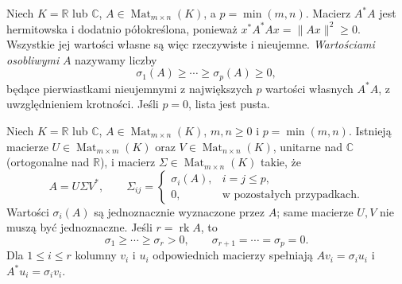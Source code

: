 \begin{definicja}
\label{def:lin15-singular-values}
Niech \(K=\mathbb R\) lub \(\mathbb C\),
\(A\in\operatorname{Mat}_{m\times n}(K)\),
a \(p=\min(m,n)\).
Macierz \(A^*A\) jest hermitowska
i dodatnio półokreślona, ponieważ
\(x^*A^*Ax=\|Ax\|^2\ge0\).
Wszystkie jej wartości własne
są więc rzeczywiste i nieujemne.
\emph{Wartościami osobliwymi}
\(A\) nazywamy liczby
\[
 \sigma_1(A)\ge\cdots\ge\sigma_p(A)\ge0,
\]
będące pierwiastkami
nieujemnymi z największych \(p\)
wartości własnych \(A^*A\),
z uwzględnieniem krotności.
Jeśli \(p=0\), lista jest pusta.
\end{definicja}

\begin{twierdzenie}
\label{thm:lin15-svd}
Niech \(K=\mathbb R\) lub \(\mathbb C\),
\(A\in\operatorname{Mat}_{m\times n}(K)\),
\(m,n\ge0\) i \(p=\min(m,n)\).
Istnieją macierze
\(U\in\operatorname{Mat}_{m\times m}(K)\)
oraz
\(V\in\operatorname{Mat}_{n\times n}(K)\),
unitarne nad \(\mathbb C\)
(ortogonalne nad \(\mathbb R\)),
i macierz
\(\Sigma\in\operatorname{Mat}_{m\times n}(K)\)
takie, że
\[
 A=U\Sigma V^*,\qquad
 \Sigma_{ij}=
 \begin{cases}
 \sigma_i(A),&i=j\le p,\\
 0,&\text{w pozostałych przypadkach}.
 \end{cases}
\]
Wartości \(\sigma_i(A)\) są
jednoznacznie wyznaczone przez \(A\);
same macierze \(U,V\)
nie muszą być jednoznaczne.
Jeśli \(r=\operatorname{rk}A\), to
\[
 \sigma_1\ge\cdots\ge\sigma_r>0,
 \qquad
 \sigma_{r+1}=\cdots=\sigma_p=0.
\]
Dla \(1\le i\le r\) kolumny
\(v_i\) i \(u_i\) odpowiednich
macierzy spełniają
\(Av_i=\sigma_i u_i\)
i \(A^*u_i=\sigma_i v_i\).
\end{twierdzenie}
